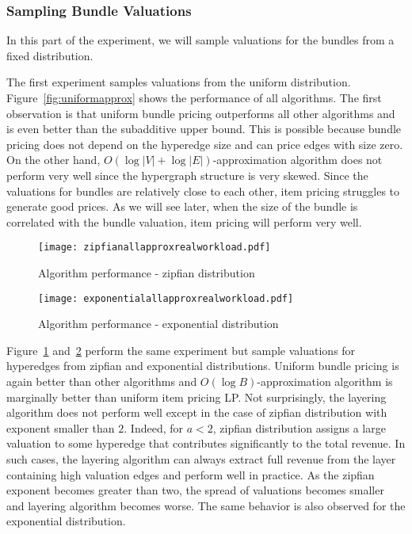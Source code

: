 \subsubsection{Sampling Bundle Valuations} 
In this part of the experiment, we will sample valuations for the bundles from a fixed distribution.

\smallskip
{} The first experiment samples valuations from the uniform distribution. Figure~\ref{fig:uniformapprox} shows the performance of all algorithms. The first observation is that uniform bundle pricing outperforms all other algorithms and is even better than the subadditive upper bound. This is possible because bundle pricing does not depend on the hyperedge size and can price edges with size zero. On the other hand, $O(\log |V|+\log |E|)$-approximation algorithm does not perform very well since the hypergraph structure is very skewed. Since the valuations for bundles are relatively close to each other, item pricing struggles to generate good prices. As we will see later, when the size of the bundle is correlated with the bundle valuation, item pricing will perform very well.  

\begin{figure*}[t]
	\begin{subfigure}{0.45\textwidth} 
		\hspace{-20mm}
		\texttt{[image: zipfianallapproxrealworkload.pdf]}
		\caption{Algorithm performance - zipfian distribution} \label{fig:zipfianapprox}
	\end{subfigure} 
	\begin{subfigure}{0.45\textwidth} 
		\texttt{[image: exponentialallapproxrealworkload.pdf]}
		\caption{Algorithm performance - exponential distribution} \label{fig:exponentialapprox}
	\end{subfigure} 
	\caption{Sampling valuations from zipfian and exponential distribution}
\end{figure*}

\smallskip
{} Figure~\ref{fig:zipfianapprox} and~\ref{fig:exponentialapprox} perform the same experiment but sample valuations for hyperedges from zipfian and exponential distributions. Uniform bundle pricing is again better than other algorithms and $O(\log B)$-approximation algorithm is marginally better than uniform item pricing LP. Not surprisingly, the layering algorithm does not perform well except in the case of zipfian distribution with exponent smaller than $2$. Indeed, for $a < 2$, zipfian distribution assigns a large valuation to some hyperedge that contributes significantly to the total revenue. In such cases, the layering algorithm can always extract full revenue from the layer containing high valuation edges and perform well in practice. As the zipfian exponent becomes greater than two, the spread of valuations becomes smaller and layering algorithm becomes worse. The same behavior is also observed for the exponential distribution. 

